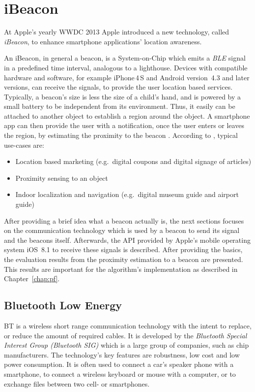 \chapter{iBeacon} \label{chap:ibeacons}
At Apple's yearly \ac{WWDC} 2013 Apple introduced a new technology, called \emph{iBeacon}, to enhance smartphone applications' location awareness.

An iBeacon, in general a beacon, is a System-on-Chip which emits a \emph{\acf{BLE}} signal in a predefined time interval, analogous to a lighthouse. Devices with compatible hardware and software, for example iPhone\,4\,S and Android version~4.3 and later versions, can receive the signals, to provide the user location based services. Typically, a beacon's size is less the size of a child's hand, and is powered by a small battery to be independent from its environment. Thus, it easily can be attached to another object to establish a region around the object. A smartphone app can then provide the user with a notification, once the user enters or leaves the region, by estimating the proximity to the beacon \citep{apple:getting_started,binside:ds}. According to \citet{binside:ds}, typical use-cases are:
\begin{itemize}
  \item Location based marketing (e.g.\ digital coupons and digital signage of articles)
  \item Proximity sensing to an object
  \item Indoor localization and navigation (e.g.\ digital museum guide and airport guide)
\end{itemize}

\noindent After providing a brief idea what a beacon actually is, the next sections focuses on the communication technology which is used by a beacon to send its signal and the beacons itself. Afterwards, the \acs{API} provided by Apple's mobile operating system iOS~8.1 to receive these signals is described. After providing the basics, the evaluation results from the proximity estimation to a beacon are presented. This results are important for the algorithm's implementation as described in Chapter~\ref{chap:pf}.


\section{Bluetooth Low Energy}\label{sec:ble}
\ac{BT} is a wireless short range communication technology with the intent to replace, or reduce the amount of required cables. It is developed by the \emph{Bluetooth Special Interest Group (Bluetooth SIG)} which is a large group of companies, such as chip manufacturers. The technology's key features are robustness, low cost and low power consumption. It is often used to connect a car's speaker phone with a smartphone, to connect a wireless keyboard or mouse with a computer, or to exchange files between two cell- or smartphones.

